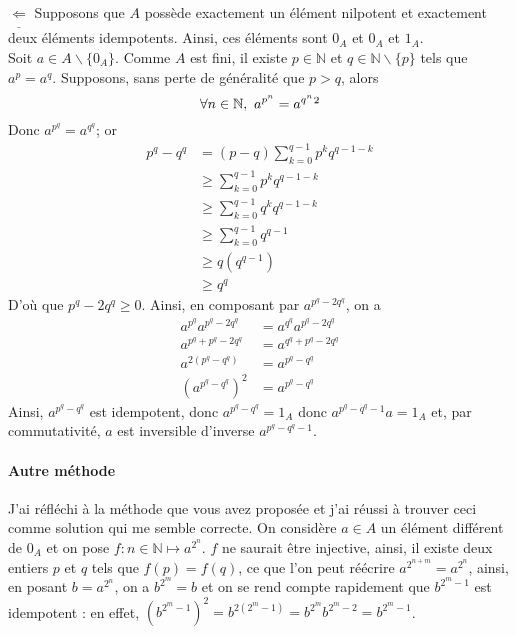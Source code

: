 \documentclass[17pt]{article}
\def\N{\mathbb N}
\def\reciproque{\Longleftarrow}
\begin{document}
	$\underline{\reciproque}$ Supposons que $A$ possède exactement un élément nilpotent et exactement deux éléments idempotents. Ainsi, ces éléments sont $0_A$ et $0_A$ et $1_A$.\\
	Soit $a\in A\backslash\lbrace 0_A\rbrace$. Comme $A$ est fini, il existe $p\in\N$ et $q\in\N\backslash\lbrace p\rbrace$ tels que $a^p=a^q$\footnotemark[1]. Supposons, sans perte de généralité que $p>q$, alors
	\[\forall n\in\N,\ a^{p^n}=a^{q^n}\footnotemark[2]\]
	Donc $a^{p^q}=a^{q^q}$; or
	\begin{align*}
		p^q-q^q &= (p-q)\sum_{k=0}^{q-1}p^kq^{q-1-k}\\
				&\geq \sum_{k=0}^{q-1}p^kq^{q-1-k}\\
				&\geq \sum_{k=0}^{q-1}q^kq^{q-1-k}\\
				&\geq \sum_{k=0}^{q-1}q^{q-1}\\
				&\geq q(q^{q-1})\\
				&\geq q^q
	\end{align*}
	D'où que $p^q-2q^q\geq0$. Ainsi, en composant par $a^{p^q-2q^q}$, on a 
	\begin{align*}
		a^{p^q}a^{p^q-2q^q} &= a^{q^q}a^{p^q-2q^q}\\
		a^{p^q+p^q-2q^q}    &= a^{q^q+p^q-2q^q}\\
		a^{2(p^q-q^q)}      &= a^{p^q-q^q}\\
		(a^{p^q-q^q})^2     &= a^{p^q-q^q}
	\end{align*}
	Ainsi, $a^{p^q-q^q}$ est idempotent, donc $a^{p^q-q^q}=1_A$ donc $a^{p^q-q^q-1}a=1_A$ et, par commutativité, $a$ est inversible d'inverse $a^{p^q-q^q-1}$.


	\paragraph{Autre méthode} J'ai réfléchi à la méthode que vous avez proposée et j'ai réussi à trouver ceci comme solution qui me semble correcte. On considère $a\in A$ un élément différent de $0_A$ et on pose $f:n\in\N\mapsto a^{2^n}$. $f$ ne saurait être injective, ainsi, il existe deux entiers $p$ et $q$ tels que $f(p)=f(q)$, ce que l'on peut réécrire $a^{2^{n+m}}=a^{2^n}$, ainsi, en posant $b=a^{2^n}$, on a $b^{2^m}=b$ et on se rend compte rapidement que $b^{2^m-1}$ est idempotent : en effet, $(b^{2^m-1})^2=b^{2(2^m-1)}=b^{2^m}b^{2^m-2}=b^{2^m-1}$. 
\end{document}
